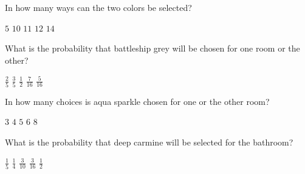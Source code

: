 \documentclass[answers,12pt]{exam}
\begin{document}
\begin{questions}
\question\label{FirstColor}
In how many ways can the two colors be selected?\\
\begin{oneparchoices}
\choice $5$ %
\correctchoice $10$
\choice $11$ %
\choice $12$ %
\choice $14$ %
\end{oneparchoices}

\question
What is the probability that battleship grey will be chosen
for one room or the other?\\
\begin{oneparchoices}
\choice $\frac{2}{5}$ %
\correctchoice $\frac{3}{5}$
\choice $\frac{1}{2}$ %
\choice $\frac{7}{16}$ %
\choice $\frac{5}{16}$ %
\end{oneparchoices}

\question
In how many choices is aqua sparkle chosen for
one or the other room?\\
\begin{oneparchoices}
\choice $3$
\correctchoice $4$
\choice $5$ %
\choice $6$ %
\choice $8$
\end{oneparchoices}

\question\label{LastColor}
What is the probability that deep carmine will be selected
for the bathroom?\\
\begin{oneparchoices}
\correctchoice $\frac{1}{5}$
\choice $\frac{1}{4}$ %
\choice $\frac{3}{10}$ %
\choice $\frac{3}{16}$ %
\choice $\frac{1}{2}$ %
\end{oneparchoices}
\end{questions}
\end{document}
